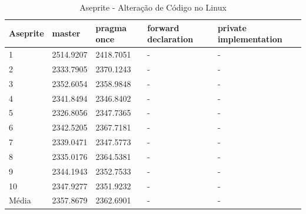 \begin{table}[!h]
\centering
\caption{Aseprite - Alteração de Código no Linux }
\label{tab:alteracao_de_codigo:linux:aseprite}
\begin{tabular}{lllll}
\textbf{Aseprite} & \textbf{master} & \textbf{pragma once} & \textbf{forward declaration} & \textbf{private implementation}   \\ \toprule
1                      &    2514.9207         &  2418.7051   &  -   &  -   \\ 
2                      &    2333.7905         &  2370.1243   &  -   &  -   \\ 
3                      &    2352.6054         &  2358.9848   &  -   &  -   \\ 
4                      &    2341.8494         &  2346.8402   &  -   &  -   \\ 
5                      &    2326.8056         &  2347.7365   &  -   &  -   \\ 
6                      &    2342.5205         &  2367.7181   &  -   &  -   \\ 
7                      &    2339.0471         &  2347.5773   &  -   &  -   \\ 
8                      &    2335.0176         &  2364.5381   &  -   &  -   \\ 
9                      &    2344.1943         &  2352.7533   &  -   &  -   \\ 
10                     &    2347.9277         &  2351.9232   &  -   &  -   \\ \bottomrule
Média                  &    2357.8679         &  2362.6901   &  -   &  -   \\ 
\end{tabular}
\end{table}

